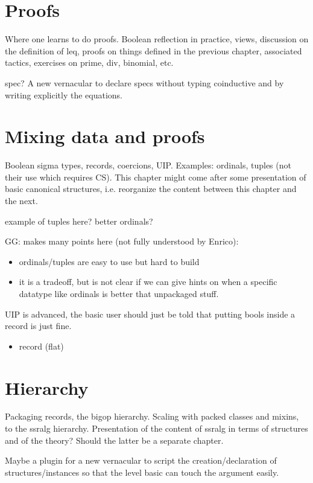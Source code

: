 \documentclass{book}
\begin{document}
\chapter{Proofs}

Where one learns to do proofs.
Boolean reflection in practice, views, discussion on the definition of leq,
proofs on things defined in the
previous chapter, associated tactics, exercises on prime, div,
binomial, etc.

spec? A new vernacular to declare specs without typing coinductive and
by writing explicitly the equations.



\chapter{Mixing data and proofs}
Boolean sigma types, records, coercions, UIP. Examples: ordinals,
tuples (not their use which requires CS). This chapter might come
after some presentation of basic canonical structures, i.e. reorganize
the content between this chapter and the next.

example of tuples here? better ordinals?

GG: makes many points here (not fully understood by Enrico):
\begin{itemize}
\item ordinals/tuples are easy to use but hard to build
\item it is a tradeoff, but is not clear if we can give hints on when
	a specific datatype like ordinals is better that unpackaged
	stuff.
\end{itemize}

UIP is advanced, the basic user should just be told that putting
bools inside a record is just fine.

\begin{itemize}
	\item record (flat)
	
\end{itemize}


\chapter{Hierarchy}
Packaging records, the bigop hierarchy.
Scaling with packed classes and mixins, to the ssralg
hierarchy. Presentation of the content of ssralg in terms of structures
and of the theory? Should the latter be a separate chapter.

Maybe a plugin for a new vernacular to script the creation/declaration
of structures/instances so that the level basic can touch the argument
easily.
\end{document}

